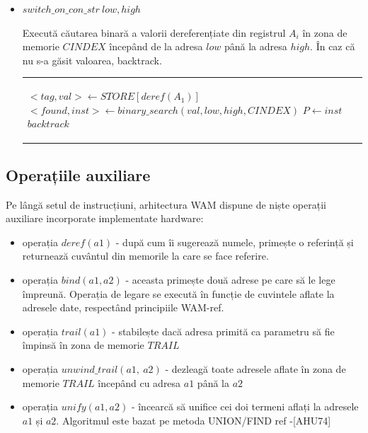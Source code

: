 \documentclass[12pt,a4paper,twoside]{report}
\begin{document}
\begin{itemize}
	\item \(switch\_on\_con\_str\ low,high\) \\
	\begin{minipage}{0.45\textwidth}
		  Execută căutarea binară a valorii dereferențiate din registrul $A_i$ în zona de memorie $CINDEX$ începând de la adresa $low$ până la adresa $high$. În caz că nu s-a găsit valoarea, backtrack.
        \end{minipage}%
	\hfill
	\begin{minipage}{0.45\textwidth}
	\begin{tabular}{|p{\textwidth}}
	\begin{algorithmic}
		\State $<tag, val> \gets STORE[deref(A_1)]$
		\State $<found, inst> \gets binary\_search(val, low, high, CINDEX)$
		\If{$found$}
			\State $P \gets inst$
		\Else
			\State $backtrack$
		\EndIf	
	\end{algorithmic}
	\end{tabular}
	\end{minipage}%
\end{itemize}

\subsection{Operațiile auxiliare}
Pe lângă setul de instrucțiuni, arhitectura WAM dispune de niște operații auxiliare incorporate implementate hardware:
\begin{itemize}
\item operația $deref(a1)$ - după cum îi sugerează numele, primește o referință și returnează cuvântul din memorile la care se face referire.
\item operația $bind(a1, a2)$ - aceasta primește două adrese pe care să le lege împreună. Operația de legare se execută în funcție de cuvintele aflate la adresele date, respectând principiile WAM-ref.
\item operația $trail(a1)$ - stabilește dacă adresa primită ca parametru să fie împinsă în zona de memorie $TRAIL$
\item operația $unwind\_trail(a1,\ a2)$ - dezleagă toate adresele aflate în zona de memorie $TRAIL$ începând cu adresa $a1$ până la $a2$
\item operația $unify(a1, a2)$ - încearcă să unifice cei doi termeni aflați la adresele $a1$ și $a2$. Algoritmul este bazat pe metoda UNION/FIND ref -[AHU74]
\end{itemize}
\end{document}
